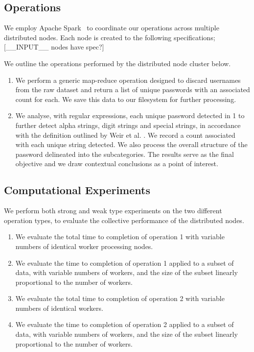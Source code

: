 \documentclass{article}
\begin{document}
\begin{multicols}{2}
\subsection*{Operations}
We employ Apache Spark~\cite{apache-spark} to coordinate our operations across multiple distributed nodes. Each node is created to the following specifications; [\_\_INPUT\_\_ nodes have spec?]
\par We outline the operations performed by the distributed node cluster below.
\begin{enumerate}[1.]
\item We perform a generic map-reduce operation designed to discard usernames from the raw dataset and return a list of unique passwords with an associated count for each. We save this data to our filesystem for further processing.
\item We analyse, with regular expressions, each unique password detected in 1 to further detect alpha strings, digit strings and special strings, in accordance with the definition outlined by Weir et al. \cite{weir2009password}. We record a count associated with each unique string detected. We also process the overall structure of the password delineated into the subcategories. The results serve as the final objective and we draw contextual conclusions as a point of interest.
\end{enumerate}

\subsection*{Computational Experiments}
We perform both strong and weak type experiments on the two different operation types, to evaluate the collective performance of the distributed nodes. 

\begin{enumerate}[1.]
\item We evaluate the total time to completion of operation 1 with variable numbers of identical worker processing nodes.
\item We evaluate the time to completion of operation 1 applied to a subset of data, with variable numbers of workers, and the size of the subset linearly proportional to the number of workers.
\item We evaluate the total time to completion of operation 2 with variable numbers of identical workers.
\item We evaluate the time to completion of operation 2 applied to a subset of data, with variable numbers of workers, and the size of the subset linearly proportional to the number of workers.
\end{enumerate}


\end{multicols}
\end{document}
